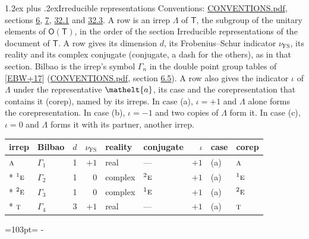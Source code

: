 \documentclass[10pt,a4paper]{article}
\makeatletter
\renewcommand\section{\@startsection{section}{1}{\z@}{-3ex plus -1ex minus -.2ex}%
  {1.2ex plus .2ex}{\normalfont\large\sffamily\bfseries\color{parttitle}}}
\newcommand{\needspace}[1]{\par\penalty-100\begingroup\dimen0=#1\relax\dimen2=\pagegoal
  \advance\dimen2-\pagetotal\ifdim\dimen0>\dimen2\relax\ifdim\dimen2>0pt\vfil\break\fi\fi
  \endgroup}
\numberwithin{equation}{section}
\newcommand{\eltfont}[1]{{\let\sigma\eltsigma\mathelt{#1}}}
\newcommand{\grp}[1]{\mathsf{#1}}
\newcommand{\irr}[1]{\text{\normalfont\scshape #1}}
\newcommand{\conjpair}[1]{{}^{#1}}
\newcommand{\elt}[1]{\eltfont{#1}}
\newcommand{\fsind}{\nu_{\mathrm{FS}}}
\makeatother
\begin{document}
\section{Irreducible representations}\label{s:irreps}
Conventions: \href{../../CONVENTIONS.pdf}{CONVENTIONS.pdf}, sections \href{../../../rotation/CONVENTIONS.pdf\#conv.6}{6}, \href{../../../rotation/CONVENTIONS.pdf\#conv.7}{7}, \href{../../CONVENTIONS.pdf\#conv.32.1}{32.1} and \href{../../CONVENTIONS.pdf\#conv.32.3}{32.3}.
\leavevmode\label{n:irrep.Delta}A row is an irrep $\Lambda$ of $\grp{T}$, the subgroup of the unitary elements of $\grp{O}(\grp{T})$, in the order of the section Irreducible representations of the document of \href{../../../rotation/data/pdf/T.pdf}{$\grp{T}$}. \label{n:index.dimension}\label{n:index.frobenius}\label{n:head.irrep}\label{n:head.reality}\label{n:head.conjugate}A row gives its dimension $d$, its Frobenius--Schur indicator $\fsind$, its reality and its complex conjugate (conjugate, a dash for the others), as in that section. \label{n:head.bilbao}\label{n:irrep.alias.gamma}Bilbao is the irrep's symbol $\Gamma_n$ in the double point group tables of [\href{../../../REFERENCES.pdf\#ref.EBW+17}{EBW+17}] (\href{../../CONVENTIONS.pdf}{CONVENTIONS.pdf}, section \href{../../../rotation/CONVENTIONS.pdf\#conv.6.5}{6.5}). \label{n:head.case.corep}\label{n:head.corep}A row also gives the indicator $\iota$ of $\Lambda$ under the representative $\elt{a}$, its case and the corepresentation that contains it (corep), named by its irreps. In case (a), $\iota = +1$ and $\Lambda$ alone forms the corepresentation. In case (b), $\iota = -1$ and two copies of $\Lambda$ form it. In case (c), $\iota = 0$ and $\Lambda$ forms it with its partner, another irrep.
\setlength{\emergencystretch}{2em}\par\setlength{\emergencystretch}{0pt}
{\small\renewcommand{\arraystretch}{1.25}\setlength{\tabcolsep}{4pt}\begin{longtable}{@{}llrrllrll@{}}\toprule
irrep & Bilbao & $d$ & $\fsind$ & reality & conjugate & $\iota$ & case & corep\\\midrule\endhead
\bottomrule\endfoot\endlastfoot
$\irr{a}$ & $\Gamma_{1}$ & 1 & $+1$ & real & --- & $+1$ & (a) & $\irr{a}$\\*
$\conjpair{1}\irr{e}$ & $\Gamma_{2}$ & 1 & $0$ & complex & $\conjpair{2}\irr{e}$ & $+1$ & (a) & $\conjpair{1}\irr{e}$\\*
$\conjpair{2}\irr{e}$ & $\Gamma_{3}$ & 1 & $0$ & complex & $\conjpair{1}\irr{e}$ & $+1$ & (a) & $\conjpair{2}\irr{e}$\\*
$\irr{t}$ & $\Gamma_{4}$ & 3 & $+1$ & real & --- & $+1$ & (a) & $\irr{t}$\\
\bottomrule\end{longtable}}
\needspace{103pt}
\end{document}

